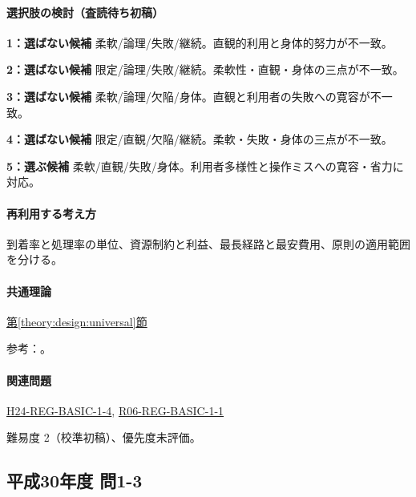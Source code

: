 \paragraph{選択肢の検討（査読待ち初稿）}\mbox{}\par

\noindent\textbf{1：選ばない候補} 柔軟/論理/失敗/継続。直観的利用と身体的努力が不一致。\par

\noindent\textbf{2：選ばない候補} 限定/論理/失敗/継続。柔軟性・直観・身体の三点が不一致。\par

\noindent\textbf{3：選ばない候補} 柔軟/論理/欠陥/身体。直観と利用者の失敗への寛容が不一致。\par

\noindent\textbf{4：選ばない候補} 限定/直観/欠陥/継続。柔軟・失敗・身体の三点が不一致。\par

\noindent\textbf{5：選ぶ候補} 柔軟/直観/失敗/身体。利用者多様性と操作ミスへの寛容・省力に対応。\par

\paragraph{再利用する考え方} 到着率と処理率の単位、資源制約と利益、最長経路と最安費用、原則の適用範囲を分ける。

\paragraph{共通理論} \hyperref[theory:design:universal]{第\ref*{theory:design:universal}節}

\par 参考：\cite{design48_ud}。

\paragraph{関連問題} \hyperref[q:h24-reg-basic-1-4]{H24-REG-BASIC-1-4}, \hyperref[q:r06-reg-basic-1-1]{R06-REG-BASIC-1-1}

\par 難易度 2（校準初稿）、優先度未評価。

\subsection{平成30年度 問1-3}
\label{q:h30-reg-basic-1-3}

